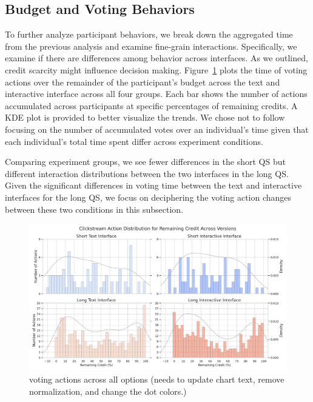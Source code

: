 \subsection{Budget and Voting Behaviors}
To further analyze participant behaviors, we break down the aggregated time from the previous analysis and examine fine-grain interactions. Specifically, we examine if there are differences among behavior across interfaces. As we outlined, credit scarcity might influence decision making.  Figure~\ref{fig:voting_all} plots the time of voting actions over the remainder of the participant's budget across the text and interactive interface across all four groups. Each bar shows the number of actions accumulated across participants at specific percentages of remaining credits. A KDE plot is provided to better visualize the trends. We chose not to follow ~\textcite{quarfoot2017quadratic} focusing on the number of accumulated votes over an individual's time given that each individual's total time spent differ across experiment conditions.

Comparing experiment groups, we see fewer differences in the short QS but different interaction distributions between the two interfaces in the long QS. Given the significant differences in voting time between the text and interactive interfaces for the long QS, we focus on deciphering the voting action changes between these two conditions in this subsection.

\begin{figure}[ht]
    \centering
    \includegraphics[width=\textwidth]{content/image/results/clickstream_action_distribution.pdf}
    \caption{voting actions across all options (needs to update chart text, remove normalization, and change the dot colors.)}
    \label{fig:voting_all}
\end{figure}

